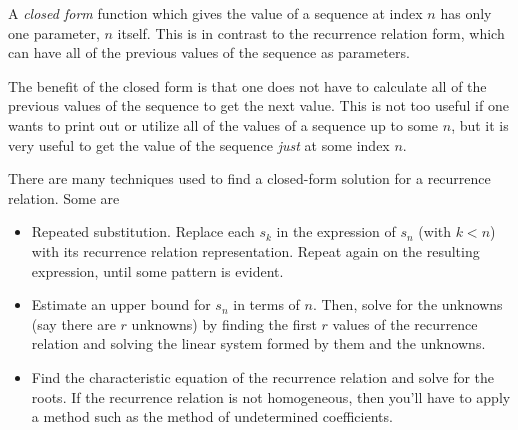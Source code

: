 \documentclass{article}
\begin{document}
A \emph{closed form} function which gives the value of a sequence at index $n$ has only one parameter, $n$ itself.  This is in contrast to the recurrence relation form, which can have all of the previous values of the sequence as parameters.

The benefit of the closed form is that one does not have to calculate all of the previous values of the sequence to get the next value.  This is not too useful if one wants to print out or utilize all of the values of a sequence up to some $n$, but it is very useful to get the value of the sequence \emph{just} at some index $n$.

There are many techniques used to find a closed-form solution for a recurrence relation.  Some are

\begin{itemize}
\item Repeated substitution.  Replace each $s_k$ in the expression of $s_n$ (with $k < n$) with its recurrence relation representation.  Repeat again on the resulting expression, until some pattern is evident.
\item Estimate an upper bound for $s_n$ in terms of $n$.  Then, solve for the unknowns (say there are $r$ unknowns) by finding the first $r$ values of the recurrence relation and solving the linear system formed by them and the unknowns.
\item Find the characteristic equation of the recurrence relation and solve for the roots.  If the recurrence relation is not homogeneous, then you'll have to apply a method such as the method of undetermined coefficients.
\end{itemize}
\end{document}
